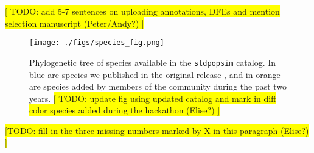 \documentclass[hidelinks]{article}
\newcommand{\stdpopsim}{\texttt{stdpopsim}\xspace}
\begin{document}
\colorbox{yellow}{[ TODO: add 5-7 sentences on uploading annotations, DFEs and mention selection manuscript (Peter/Andy?) ]}
%



\begin{figure}
	\texttt{[image: ./figs/species\_fig.png]}
	\caption{Phylogenetic tree of species available in the \texttt{\stdpopsim} catalog. 
		In blue are species we published in the original release \citep{Adrion2020}, and in orange are species added by members of the community during the past two years. 
		\colorbox{yellow}{[ TODO: update fig using updated catalog and mark in diff color species added during the hackathon (Elise?) ]}}
	\label{fig:tree}
\end{figure}


\colorbox{yellow}{[TODO: fill in the three missing numbers marked by X in this paragraph (Elise?) ]}
\end{document}
